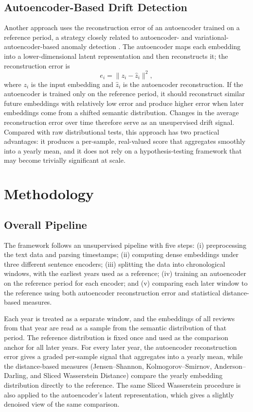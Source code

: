 \documentclass[conference]{IEEEtran}
\begin{document}
\subsection{Autoencoder-Based Drift Detection}

Another approach uses the reconstruction error of an autoencoder trained on a reference period, a strategy closely related to autoencoder- and variational-autoencoder-based anomaly detection \cite{ancho2015}. The autoencoder maps each embedding into a lower-dimensional latent representation and then reconstructs it; the reconstruction error is
\begin{equation}
e_i = \|z_i - \hat{z}_i\|^2,\label{eq:recon}
\end{equation}
where $z_i$ is the input embedding and $\hat{z}_i$ is the autoencoder reconstruction. If the autoencoder is trained only on the reference period, it should reconstruct similar future embeddings with relatively low error and produce higher error when later embeddings come from a shifted semantic distribution. Changes in the average reconstruction error over time therefore serve as an unsupervised drift signal. Compared with raw distributional tests, this approach has two practical advantages: it produces a per-sample, real-valued score that aggregates smoothly into a yearly mean, and it does not rely on a hypothesis-testing framework that may become trivially significant at scale.

\section{Methodology}
\label{sec:methodology}

\subsection{Overall Pipeline}

The framework follows an unsupervised pipeline with five steps: (i) preprocessing the text data and parsing timestamps; (ii) computing dense embeddings under three different sentence encoders; (iii) splitting the data into chronological windows, with the earliest years used as a reference; (iv) training an autoencoder on the reference period for each encoder; and (v) comparing each later window to the reference using both autoencoder reconstruction error and statistical distance-based measures.

Each year is treated as a separate window, and the embeddings of all reviews from that year are read as a sample from the semantic distribution of that period. The reference distribution is fixed once and used as the comparison anchor for all later years. For every later year, the autoencoder reconstruction error gives a graded per-sample signal that aggregates into a yearly mean, while the distance-based measures (Jensen--Shannon, Kolmogorov--Smirnov, Anderson--Darling, and Sliced Wasserstein Distance) compare the yearly embedding distribution directly to the reference. The same Sliced Wasserstein procedure is also applied to the autoencoder's latent representation, which gives a slightly denoised view of the same comparison.
\end{document}
